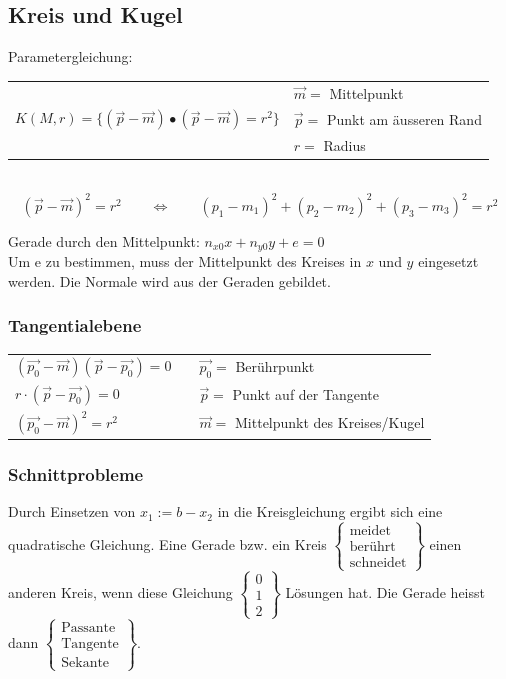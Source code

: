 \subsection{Kreis und Kugel}
	Parametergleichung: \begin{tabular}{ll}
		& $\vec{m} =$ Mittelpunkt \\
		$K(M,r) = \lbrace (\vec{p} - \vec{m}) \bullet (\vec{p} - \vec{m}) = r^2 \rbrace$ & $\vec{p} =$ Punkt am äusseren Rand\\
		& $r =$ Radius
	\end{tabular}\\

	\begin{equation*}
		(\vec{p} - \vec{m})^2 = r^2  \qquad \Leftrightarrow \qquad (p_1 - m_1)^2 + (p_2 - m_2)^2 + (p_3 - m_3)^2 = r^2
	\end{equation*}
	
	Gerade durch den Mittelpunkt: $n_{x0}x+n_{y0}y+e=0$  \\
	Um e zu bestimmen, muss der Mittelpunkt des Kreises in $x$ und $y$ eingesetzt werden. Die Normale wird aus der Geraden gebildet.

	\subsubsection{Tangentialebene}
		\begin{tabular}{lll}
			$(\vec{p_0} - \vec{m})(\vec{p} - \vec{p_0}) = 0$ & & $\vec{p_0} =$ Berührpunkt\\
			$r \cdot (\vec{p} - \vec{p_0}) = 0$ & & $\vec{p} =$ Punkt auf der Tangente\\
			$(\vec{p_0} - \vec{m})^2 = r^2$ & & $\vec{m} =$ Mittelpunkt des Kreises/Kugel
		\end{tabular}

	\subsubsection{Schnittprobleme}
		Durch Einsetzen von $x_1:=b-x_2$ in die Kreisgleichung ergibt sich eine
		quadratische Gleichung. Eine Gerade bzw. ein Kreis
		$\left\{\begin{array}{l}\mbox{meidet}\\ \mbox{berührt}\\ \mbox{schneidet}\end{array}\right\}$ einen
		anderen Kreis, wenn diese Gleichung
		$\left\{\begin{array}{l}0\\1\\2\end{array}\right\}$ Lösungen hat. Die Gerade
		heisst dann
		$\left\{\begin{array}{l} \mbox{Passante}\\ \mbox{Tangente}\\ \mbox{Sekante}\end{array}\right\}$. 
	
